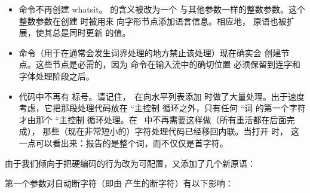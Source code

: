 \begin{itemize}
    在一连串显式连字符之后插入断字符的工作，与其他断字处理同时发生，
    而{\it 不是}在主控制循环内部。

    \LUATEX\ 对  的唯一用途，是检查一个词是否根本应该被纳入断字。
    如果一个词中第一个字符节点所附字体的  为负，则立即放弃对该词的
    断字。这种行为仅是为了向后兼容而添加的，在新的 \LUATEX\ 文档中不应再使用
     作为阻止断字的手段。

\item {} 命令不再创建 whatsit。 的含义被改为一个
    与其他参数一样的整数参数。这个整数参数在创建  时被用来
    向字形节点添加语言信息。相应地， 原语也被扩展，使其总是同时更新
     的值。

\item {} 命令（用于在通常会发生词界处理的地方禁止该处理）现在确实会
    创建节点。这些节点是必需的，因为  命令在输入流中的确切位置
    必须保留到连字和字体处理阶段之后。

\item 代码中不再有  标号。请记住，\ 在向水平列表添加
     时做了大量处理。出于速度考虑，它把那段处理代码放在
    ``主控制 循环之外，只有任何 ``词 的第一个字符才由那个
    ``主控制 循环处理。在 \LUATEX\ 中不再需要这样做（所有重活都在后面完成），
    那些（现在非常短小的）字符处理代码已经移回内联。当打开  时，
    这一点可以看出来：报告的是整个词，而不仅仅是首字符。

\end{itemize}

由于我们倾向于把硬编码的行为改为可配置，又添加了几个新原语：

\begin{typing}
\hyphenpenaltymode
\automatichyphenpenalty
\explicithyphenpenalty
\end{typing}

第一个参数对自动断字符（即由  产生的断字符）有以下影响：

